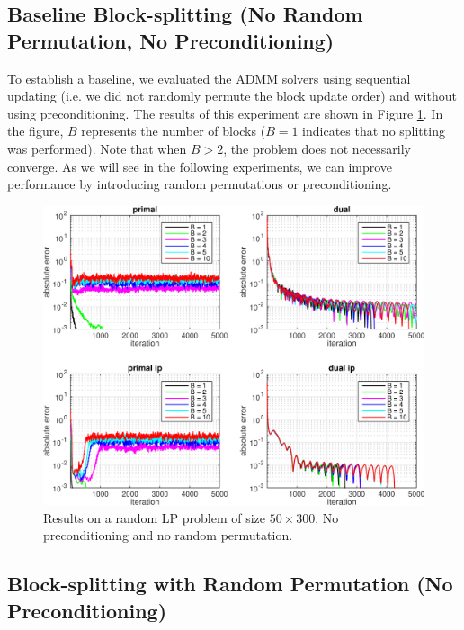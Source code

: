 \documentclass{article}
\begin{document}
\subsection*{Baseline Block-splitting (No Random Permutation, No Preconditioning)}
To establish a baseline, we evaluated the ADMM solvers using sequential updating (i.e. we did not randomly permute the block update order) and without using preconditioning. The results of this experiment are shown in Figure \ref{fig:nop_nor}. In the figure, $B$ represents the number of blocks ($B=1$ indicates that no splitting was performed). Note that when $B>2$, the problem does not necessarily converge. As we will see in the following experiments, we can improve performance by introducing random permutations or preconditioning.
\newline
\newline
\newline
\newline

\begin{figure}[h]
	\includegraphics[width=\textwidth]{../figures/noprecond_norndperm.png}
	\caption{Results on a random LP problem of size $50 \times 300$. No preconditioning and no random permutation.}
	\label{fig:nop_nor}
\end{figure}
\newpage
\subsection*{Block-splitting with Random Permutation (No Preconditioning)}
\end{document}

